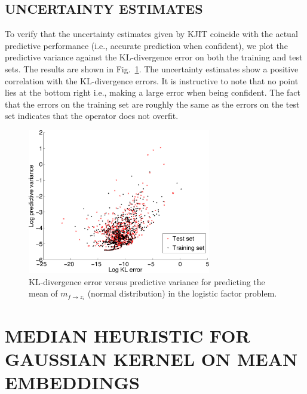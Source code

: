 \documentclass[english]{article}
\theoremstyle{plain}
\theoremstyle{plain}
\newcommand{\figref}[1]{Fig.~\ref{#1}}
\begin{document}



\subsection{UNCERTAINTY ESTIMATES}
To verify that the uncertainty estimates given by KJIT coincide with the actual 
predictive performance (i.e., accurate prediction when confident), we plot the 
predictive variance against the KL-divergence error on both the training and
test sets. The results are shown in \figref{fig:logistic_predvar_g}.
%
The uncertainty estimates show a positive correlation with the KL-divergence errors. 
It is instructive to note that no point lies at the bottom right i.e., making a
large error when being confident. 
The fact that the errors on the training set are roughly the same as the errors
on the test set indicates that the operator does not overfit.

\begin{figure}[t]
  \centering
  \includegraphics[width=8cm]{img/pred_var/fm_kgg_joint_-bw-out1-crop}
  \caption{KL-divergence error versus predictive variance for predicting the 
  mean of $m_{f \rightarrow z_i}$ (normal distribution) in the logistic factor problem. }
  \label{fig:logistic_predvar_g}
\end{figure}



\section{MEDIAN HEURISTIC FOR GAUSSIAN KERNEL ON MEAN EMBEDDINGS  }
\label{sec:median_heuristic}
\end{document}
